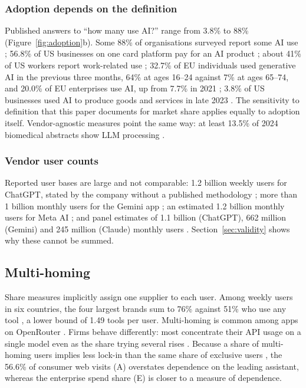\documentclass[11pt]{article}
\begin{document}
\subsubsection{Adoption depends on the definition} Published answers to ``how many use AI?'' range from 3.8\% to 88\% (Figure~\ref{fig:adoption}b). Some 88\% of organisations surveyed report some AI use \cite{aiindex2026}; 56.8\% of US businesses on one card platform pay for an AI product \cite{ramp2026index}; about 41\% of US workers report work-related use \cite{fed2026monitoring}; 32.7\% of EU individuals used generative AI in the previous three months, 64\% at ages 16--24 against 7\% at ages 65--74, and 20.0\% of EU enterprises use AI, up from 7.7\% in 2021 \cite{eurostat2025genai}; 3.8\% of US businesses used AI to produce goods and services in late 2023 \cite{census2023btos,bonney2024tracking}. The sensitivity to definition that this paper documents for market share applies equally to adoption itself. Vendor-agnostic measures point the same way: at least 13.5\% of 2024 biomedical abstracts show LLM processing \cite{kobak2025delving}.

\subsubsection{Vendor user counts} Reported user bases are large and not comparable: 1.2 billion weekly users for ChatGPT, stated by the company without a published methodology \cite{bigtech2026wau}; more than 1 billion monthly users for the Gemini app \cite{alphabet2026q3}; an estimated 1.2 billion monthly users for Meta AI \cite{counterpoint2026mau}; and panel estimates of 1.1 billion (ChatGPT), 662 million (Gemini) and 245 million (Claude) monthly users \cite{sensortower2026state}. Section~\ref{sec:validity} shows why these cannot be summed.

\subsection{Multi-homing}
\label{sec:multihoming}

Share measures implicitly assign one supplier to each user. Among weekly users in six countries, the four largest brands sum to 76\% against 51\% who use any tool \cite{reuters2026genai}, a lower bound of 1.49 tools per user. Multi-homing is common among apps on OpenRouter \cite{fradkin2025demand}. Firms behave differently: most concentrate their API usage on a single model even as the share trying several rises \cite{demirer2025emerging}. Because a share of multi-homing users implies less lock-in than the same share of exclusive users \cite{rochet2003platform,armstrong2006competition}, the 56.6\% of consumer web visits (A) overstates dependence on the leading assistant, whereas the enterprise spend share (E) is closer to a measure of dependence.
\end{document}
